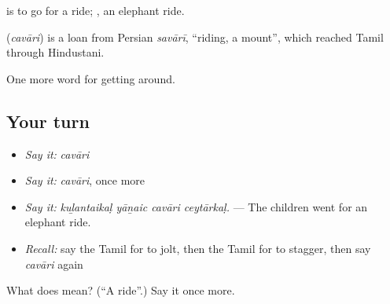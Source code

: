   is to go for a ride;  , an elephant ride.

\begin{cousinweb}
\textbf{} (\emph{cavāri}) is a loan from Persian \emph{savārī}, \textquotedblleft{}riding, a mount\textquotedblright{}, which reached Tamil through Hindustani.
\end{cousinweb}

\begin{grammarlens}[title={What you've built}]
One more word for getting around.
\end{grammarlens}

\subsection*{Your turn}
\begin{itemize}
\raggedright
  \item \emph{Say it:} \emph{cavāri}
  \item \emph{Say it:} \emph{cavāri}, once more
  \item \emph{Say it:} \emph{kuḻantaikaḷ yāṉaic cavāri ceytārkaḷ.} — The children went for an elephant ride.
  \item \emph{Recall:} say the Tamil for to jolt, then the Tamil for to stagger, then say \emph{cavāri} again
\end{itemize}

\begin{tcolorbox}[breakable,colback=teal!4,colframe=teal!35!black,title={Before you move on}]
What does  mean? (\textquotedblleft{}A ride\textquotedblright{}.) Say it once more.
\end{tcolorbox}
